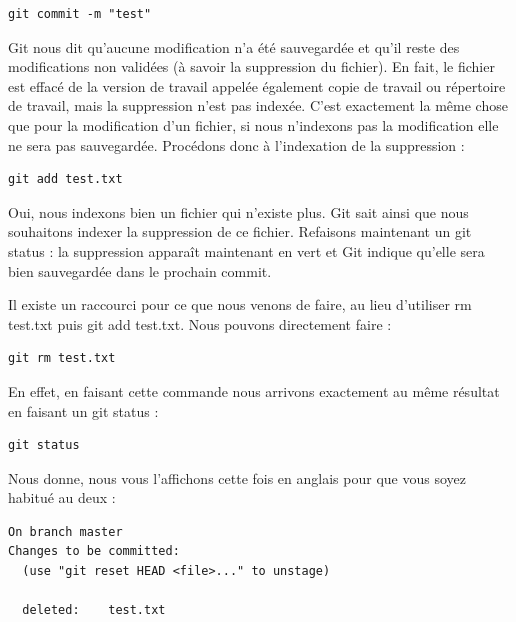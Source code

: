 \documentclass{article}
\begin{document}
\begin{verbatim}
git commit -m "test"
\end{verbatim}
{\color{blue}Git} nous dit qu'aucune modification n'a été sauvegardée et qu'il reste des modifications non validées (à savoir la suppression du fichier). En fait, le fichier est effacé de la version de travail appelée également copie de travail ou répertoire de travail, mais la suppression n'est pas indexée. C'est exactement la même chose que pour la modification d'un fichier, si nous n'indexons pas la modification elle ne sera pas sauvegardée. Procédons donc à l'indexation de la suppression :


\begin{verbatim}
git add test.txt
\end{verbatim}
Oui, nous indexons bien un fichier qui n'existe plus. {\color{blue}Git} sait ainsi que nous souhaitons indexer la suppression de ce fichier. Refaisons maintenant un {\color{blue}git status} : la suppression apparaît maintenant en vert et {\color{blue}Git} indique qu'elle sera bien sauvegardée dans le prochain {\color{blue}commit}.

Il existe un raccourci pour ce que nous venons de faire, au lieu d'utiliser {\color{blue}rm test.txt} puis {\color{blue}git add test.txt}. Nous pouvons directement faire :


\begin{verbatim}
git rm test.txt
\end{verbatim}
En effet, en faisant cette commande nous arrivons exactement au même résultat en faisant un {\color{blue}git status} :


\begin{verbatim}
git status
\end{verbatim}
Nous donne, nous vous l'affichons cette fois en anglais pour que vous soyez habitué au deux :
\begin{verbatim}
On branch master
Changes to be committed:
  (use "git reset HEAD <file>..." to unstage)

  deleted:    test.txt
\end{verbatim}
\end{document}
